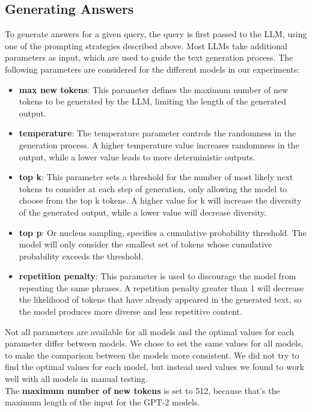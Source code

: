 \subsection{Generating Answers}
To generate answers for a given query, the query is first passed to the LLM, using one of the prompting strategies described above.
Most LLMs take additional parameters as input, which are used to guide the text generation process.
The following parameters are considered for the different models in our experiments:
\begin{itemize}
    \item \textbf{max new tokens}: This parameter defines the maximum number of new tokens to be generated by the LLM, limiting the length of the generated output.
    \item \textbf{temperature}: The temperature parameter controls the randomness in the generation process. A higher temperature value increases randomness in the output, while a lower value leads to more deterministic outputs.
    \item \textbf{top k}: This parameter sets a threshold for the number of most likely next tokens to consider at each step of generation, only allowing the model to choose from the top k tokens. A higher value for k will increase the diversity of the generated output, while a lower value will decrease diversity.
    \item \textbf{top p}:  Or nucleus sampling, specifies a cumulative probability threshold. The model will only consider the smallest set of tokens whose cumulative probability exceeds the threshold.
    \item \textbf{repetition penalty}: This parameter is used to discourage the model from repeating the same phrases. A repetition penalty greater than 1 will decrease the likelihood of tokens that have already appeared in the generated text, so the model produces more diverse and less repetitive content.
\end{itemize}
Not all parameters are available for all models and the optimal values for each parameter differ between models.
We chose to set the same values for all models, to make the comparison between the models more consistent.
We did not try to find the optimal values for each model, but instead used values we found to work well with all models in manual testing.
\\
The \textbf{maximum number of new tokens} is set to 512, because that's the maximum length of the input for the GPT-2 models.
\\
